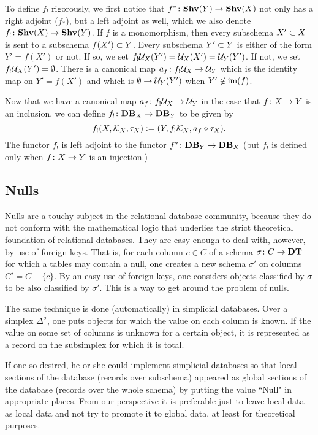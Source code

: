 \documentclass{amsart}
\def\DT{{\bf DT}}
\def\Data{{\bf DB}}
\def\im{\tn{im}}
\begin{document}
To define $f_!$ rigorously, we first notice that $f^*\taking\Shv(Y)\to\Shv(X)$ not only has a right adjoint ($f_*$), but a left adjoint as well, which we also denote $f_!\taking\Shv(X)\to\Shv(Y)$.  If $f$ is a monomorphism, then every subschema $X'\ss X$ is sent to a subschema $f(X')\ss Y$.  Every subschema $Y'\ss Y$ is either of the form $Y'=f(X')$ or not.  If so, we set $f_!\mcU_X(Y')=\mcU_X(X')=\mcU_Y(Y')$.  If not, we set $f_!\mcU_X(Y')=\emptyset$.  There is a canonical map $a_f\taking f_!\mcU_X\to\mcU_Y$ which is the identity map on $Y'=f(X')$ and which is $\emptyset\to\mcU_Y(Y')$ when $Y'\not\in\im(f)$.

Now that we have a canonical map $a_f\taking f_!\mcU_X\to\mcU_Y$ in the case that $f\taking X\to Y$ is an inclusion, we can define $f_!\taking\Data_X\to\Data_Y$ to be given by $$f_!(X,\mcK_X,\tau_X):=(Y,f_!\mcK_X,a_f\circ\tau_X).$$  The functor $f_!$ is left adjoint to the functor $f^*\taking\Data_Y\to\Data_X$ (but $f_!$ is defined only when $f\taking X\to Y$ is an injection.)

\subsection{Nulls}\label{subsec:nulls}

Nulls are a touchy subject in the relational database community, because they do not conform with the mathematical logic that underlies the strict theoretical foundation of relational databases.  They are easy enough to deal with, however, by use of foreign keys.  That is, for each column $c\in C$ of a schema $\sigma\taking C\to\DT$ for which a tables may contain a null, one creates a new schema $\sigma'$ on columns $C'=C-\{c\}$.  By an easy use of foreign keys, one considers objects classified by $\sigma$ to be also classified by $\sigma'$.  This is a way to get around the problem of nulls.

The same technique is done (automatically) in simplicial databases.  Over a simplex $\Delta^\sigma$, one puts objects for which the value on each column is known.  If the value on some set of columns is unknown for a certain object, it is represented as a record on the subsimplex for which it is total.  

If one so desired, he or she could implement simplicial databases so that local sections of the database (records over subschema) appeared as global sections of the database (records over the whole schema) by putting the value ``Null" in appropriate places.  From our perspective it is preferable just to leave local data as local data and not try to promote it to global data, at least for theoretical purposes.
\end{document}
